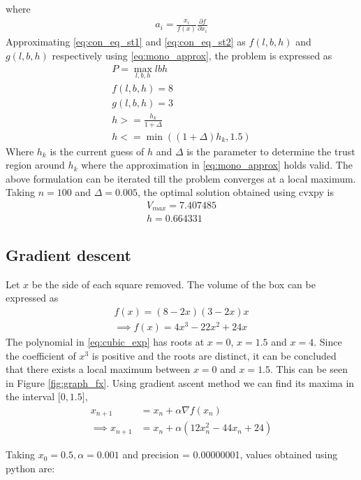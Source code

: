 \documentclass[journal,10pt,twocolumn]{article}
\providecommand{\brak}[1]{\ensuremath{\left(#1\right)}}
\begin{document}
where
\begin{align}
	a_i = \frac{x_i}{f(x)}\frac{\partial{f}}{\partial{x_i}}
\end{align}
Approximating \eqref{eq:con_eq_st1} and \eqref{eq:con_eq_st2} as $f(l,b,h)$ and $g(l,b,h)$ respectively using \eqref{eq:mono_approx}, the problem is expressed as
\begin{align}
	P = \max_{l,b,h}lbh\\
	f(l,b,h) = 8\\
	g(l,b,h) = 3\\
	h >= \frac{h_k}{1+\Delta}\\
	h <= \min((1+\Delta)h_k, 1.5)
\end{align}
Where $h_k$ is the current guess of $h$ and $\Delta$ is the parameter to determine the trust region around $h_k$ where the approximation in \eqref{eq:mono_approx} holds valid.
The above formulation can be iterated till the problem converges at a local maximum. Taking $n = 100$ and $\Delta = 0.005$, the optimal solution obtained using cvxpy is
\begin{align}
	\boxed{V_{max} = 7.407485}\\
	\boxed{h = 0.664331}
\end{align}

\subsection*{\normalsize Gradient descent}
Let $x$ be the side of each square removed. The volume of the box can be expressed as
\begin{align}
	\label{eq:vol_varx}
	f(x) = (8-2x)(3-2x)x\\
	\implies f(x) = 4x^3-22x^2+24x
	\label{eq:cubic_exp}
\end{align}
The polynomial in \eqref{eq:cubic_exp} has roots at $x = 0$, $x = 1.5$ and $x = 4$. Since the coefficient of $x^3$ is positive and the roots are distinct, it can be concluded that there exists a local maximum between $x = 0$ and $x = 1.5$. This can be seen in Figure \ref{fig:graph_fx}.
Using gradient ascent method we can find its maxima in the interval $\mathbf{[}0,1.5\mathbf{]}$,
    \begin{align}
        x_{n+1} &= x_n + \alpha \nabla f(x_n) \\
        \implies x_{n+1} &= x_n + \alpha \brak{12x_n^2-44x_n+24}
    \end{align}
    
Taking $x_0=0.5,\alpha=0.001$ and precision = 0.00000001, values obtained using python are:
    
\end{document}
